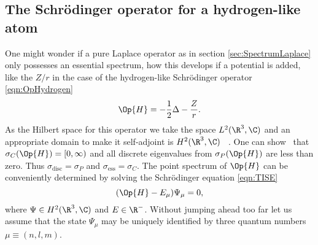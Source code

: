 \subsection{The Schrödinger operator for a hydrogen-like atom}
\label{sec:HydrogenAtom}
One might wonder if a pure Laplace operator as in section \vref{sec:SpectrumLaplace}
only possesses an essential spectrum,
how this develops if a potential is added,
like the $Z / r$ in the case of
the hydrogen-like Schrödinger operator \eqref{eqn:OpHydrogen}
\[
	\Op{H} = -\frac12 \Delta - \frac{Z}{r}.
\]
As the Hilbert space for this operator we take the \QM space $L^2(\R^3, \C)$
and an appropriate domain to make it self-adjoint is $H^2(\R^3, \C)$%
~\cite[p.~38]{Helffer2013}.
One can show~\cite{Davies2007,Teschl2014} that $\sigma_C(\Op{H}) = [0, \infty)$
and all discrete eigenvalues from $\sigma_P(\Op{H})$ are less than zero.
Thus $\sigma_\text{disc} = \sigma_P$ and $\sigma_\text{ess} = \sigma_C$.
The point spectrum of $\Op{H}$ can be conveniently
determined by solving the Schrödinger equation \eqref{eqn:TISE}
\begin{equation}
	( \Op{H} - E_{\mu} ) \Psi_\mu = 0,
	\label{eqn:HydrogenComplete}
\end{equation}
where $\Psi \in H^2(\R^3, \C)$ and $E \in \R^-$.
Without jumping ahead too far let us assume that the state
$\Psi_\mu$
may be uniquely identified by three quantum numbers $\mu \equiv (n, l, m)$.


